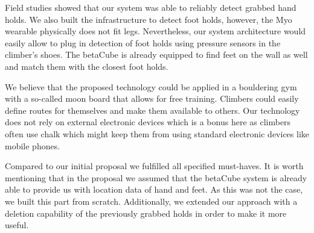 Field studies showed that our system was able to reliably detect grabbed hand holds.
We also built the infrastructure to detect foot holds, however, the Myo wearable physically does not fit legs.
Nevertheless, our system architecture would easily allow to plug in detection of foot holds using pressure sensors in the climber's shoes.
The betaCube is already equipped to find feet on the wall as well and match them with the closest foot holds.

We believe that the proposed technology could be applied in a bouldering gym with a so-called moon board that allows for free training.
Climbers could easily define routes for themselves and make them available to others.
Our technology does not rely on external electronic devices which is a bonus here as climbers often use chalk which might keep them from using standard electronic devices like mobile phones.

Compared to our initial proposal we fulfilled all specified must-haves.
It is worth mentioning that in the proposal we assumed that the betaCube system is already able to provide us with location data of hand and feet.
As this was not the case, we built this part from scratch.
Additionally, we extended our approach with a deletion capability of the previously grabbed holds in order to make it more useful.
